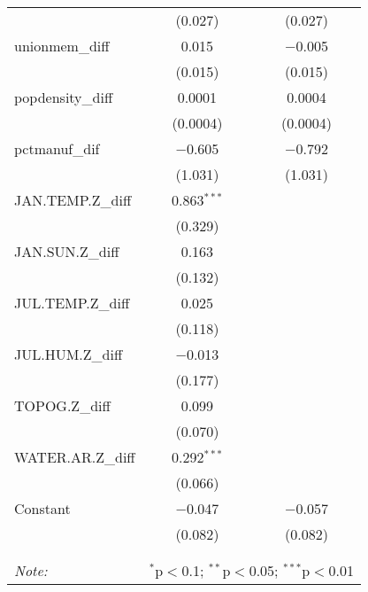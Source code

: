 \begin{table}[!htbp]
\begin{tabular}{@{\extracolsep{5pt}}lcc}
  & (0.027) & (0.027) \\ 
  unionmem\_diff & 0.015 & $-$0.005 \\ 
  & (0.015) & (0.015) \\ 
  popdensity\_diff & 0.0001 & 0.0004 \\ 
  & (0.0004) & (0.0004) \\ 
  pctmanuf\_dif & $-$0.605 & $-$0.792 \\ 
  & (1.031) & (1.031) \\ 
  JAN.TEMP.Z\_diff & 0.863$^{***}$ &  \\ 
  & (0.329) &  \\ 
  JAN.SUN.Z\_diff & 0.163 &  \\ 
  & (0.132) &  \\ 
  JUL.TEMP.Z\_diff & 0.025 &  \\ 
  & (0.118) &  \\ 
  JUL.HUM.Z\_diff & $-$0.013 &  \\ 
  & (0.177) &  \\ 
  TOPOG.Z\_diff & 0.099 &  \\ 
  & (0.070) &  \\ 
  WATER.AR.Z\_diff & 0.292$^{***}$ &  \\ 
  & (0.066) &  \\ 
  Constant & $-$0.047 & $-$0.057 \\ 
  & (0.082) & (0.082) \\ 
 \hline \\[-1.8ex] 
\hline 
\hline \\[-1.8ex] 
\textit{Note:}  & \multicolumn{2}{r}{$^{*}$p$<$0.1; $^{**}$p$<$0.05; $^{***}$p$<$0.01} \\ 
\end{tabular} 
\end{table} 
